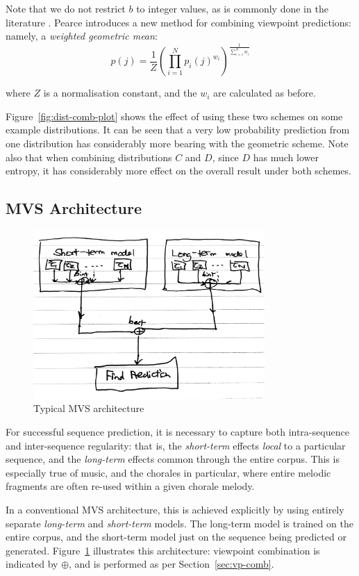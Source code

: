 \documentclass[12pt,a4paper,twoside,openright]{report}
\begin{document}
Note that we do not restrict $b$ to integer values, as is commonly done in the
literature \cite{whorley2013phd}. Pearce \cite{pearce2004improved} introduces a
new method for combining viewpoint predictions: namely, a \emph{weighted
geometric mean}:
$$ p(j) = \frac{1}{Z} \left( \prod_{i = 1}^N p_i(j)^{w_i} \right)^{ \frac{1}{
\sum_{i = 1}^N w_i }} $$

where $Z$ is a normalisation constant, and the $w_i$ are calculated as before.

Figure~\ref{fig:dist-comb-plot} shows the effect of using these two schemes on
some example distributions. It can be seen that a very low probability
prediction from one distribution has considerably more bearing with the
geometric scheme. Note also that when combining distributions $C$ and $D$, since
$D$ has much lower entropy, it has considerably more effect on the overall
result under both schemes.

\subsection{MVS Architecture}

\begin{figure}[H]
\centering
\includegraphics[width=250pt]{figs/mvs_arch_tmp.jpg}
\caption{Typical MVS architecture}
\label{fig:mvs-arch}
\end{figure}

For successful sequence prediction, it is necessary to capture both
intra-sequence and inter-sequence regularity: that is, the \emph{short-term}
effects \emph{local} to a particular sequence, and the \emph{long-term} effects
common through the entire corpus.  This is especially true of music, and the
chorales in particular, where entire melodic fragments are often re-used within
a given chorale melody.

In a conventional MVS architecture, this is achieved explicitly by using
entirely separate \emph{long-term} and \emph{short-term} models. The long-term
model is trained on the entire corpus, and the short-term model just on the
sequence being predicted or generated. Figure~\ref{fig:mvs-arch} illustrates
this architecture: viewpoint combination is indicated by $\oplus$, and is
performed as per Section~\ref{sec:vp-comb}.
\end{document}
